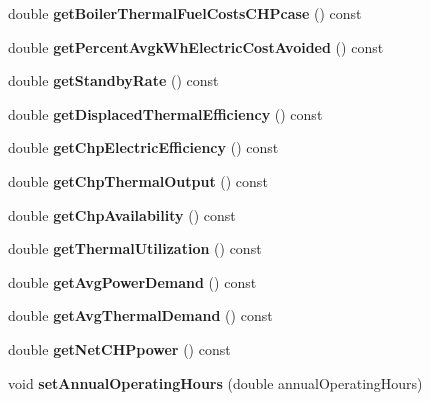 \begin{DoxyCompactItemize}
double {\bfseries get\+Boiler\+Thermal\+Fuel\+Costs\+C\+H\+Pcase} () const
\item 
\mbox{\label{class_c_h_p_ad79607b304d1e50a9421de043b7a9e7b}} 
double {\bfseries get\+Percent\+Avgk\+Wh\+Electric\+Cost\+Avoided} () const
\item 
\mbox{\label{class_c_h_p_a195f0ffe163404077b56a5e5db8eb59c}} 
double {\bfseries get\+Standby\+Rate} () const
\item 
\mbox{\label{class_c_h_p_a66b1b0e6a0d7f3181b3c1dfb590ab523}} 
double {\bfseries get\+Displaced\+Thermal\+Efficiency} () const
\item 
\mbox{\label{class_c_h_p_a1d38e08a7815211361d334263832cad6}} 
double {\bfseries get\+Chp\+Electric\+Efficiency} () const
\item 
\mbox{\label{class_c_h_p_a13e271f59d6315088416123c6e794e09}} 
double {\bfseries get\+Chp\+Thermal\+Output} () const
\item 
\mbox{\label{class_c_h_p_abd1ea13cd48f5af48799891a52634340}} 
double {\bfseries get\+Chp\+Availability} () const
\item 
\mbox{\label{class_c_h_p_aa27fd9e66e208e6b3f28fdfe182d6c32}} 
double {\bfseries get\+Thermal\+Utilization} () const
\item 
\mbox{\label{class_c_h_p_a79f9a97a010669c5ffed9339c54a36c6}} 
double {\bfseries get\+Avg\+Power\+Demand} () const
\item 
\mbox{\label{class_c_h_p_a5f8975488324e4aa3517c9e01334f4bf}} 
double {\bfseries get\+Avg\+Thermal\+Demand} () const
\item 
\mbox{\label{class_c_h_p_a317f3df613b61f401bc5c4b69fddd0cf}} 
double {\bfseries get\+Net\+C\+H\+Ppower} () const
\item 
\mbox{\label{class_c_h_p_a1b9d3ba01f7e243bcde31bd5fdff9e0a}} 
void {\bfseries set\+Annual\+Operating\+Hours} (double annual\+Operating\+Hours)
\item 

\end{DoxyCompactItemize}
